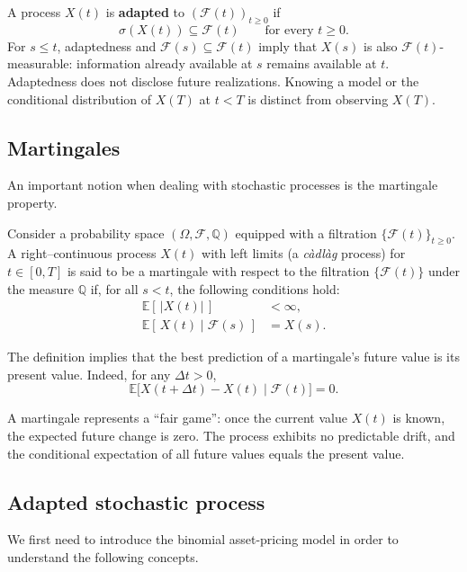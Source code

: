 A process $X(t)$ is \textbf{adapted} to $(\mathcal F(t))_{t\ge0}$ if
\[
\sigma(X(t))\subseteq\mathcal F(t)\qquad\text{for every }t\ge0.
\]
For $s\le t$, adaptedness and $\mathcal F(s)\subseteq\mathcal F(t)$
imply that $X(s)$ is also $\mathcal F(t)$-measurable: information already
available at $s$ remains available at $t$. Adaptedness does not disclose
future realizations. Knowing a model or the conditional distribution of
$X(T)$ at $t<T$ is distinct from observing $X(T)$.
\subsection{Martingales}

An important notion when dealing with stochastic processes is the martingale property.

\begin{definition}[Martingale]
Consider a probability space $(\Omega, \mathcal{F}, \mathbb{Q})$ equipped with a filtration $\{\mathcal{F}(t)\}_{t \ge 0}$.  
A right–continuous process $X(t)$ with left limits (a \emph{càdlàg} process) for $t \in [0,T]$ is said to be a martingale with respect to the filtration $\{\mathcal{F}(t)\}$ under the measure $\mathbb{Q}$ if, for all $s < t$, the following conditions hold:
\begin{align}
\mathbb{E}[\,|X(t)|\,] &< \infty, \\
\mathbb{E}[\,X(t)\mid \mathcal{F}(s)\,] &= X(s).
\end{align}
\end{definition}

The definition implies that the best prediction of a martingale’s future value is its present value. Indeed, for any $\Delta t > 0$,
\[
\mathbb{E}\big[X(t+\Delta t) - X(t)\mid \mathcal{F}(t)\big] = 0.
\]

\begin{remark}
A martingale represents a ``fair game'': once the current value $X(t)$ is known, the expected future change is zero. The process exhibits no predictable drift, and the conditional expectation of all future values equals the present value.
\end{remark}
\subsection{Adapted stochastic process}

We first need to introduce the binomial asset-pricing model in order to understand the following concepts.

